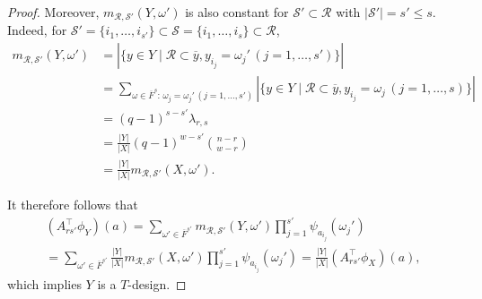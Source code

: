 \documentclass[10pt,a4paper]{amsart}
\begin{document}
\begin{proof}
Moreover, $m_{\mathcal{R},\mathcal{S}'}(Y,\omega')$ is also constant for $\mathcal{S}'\subset \mathcal{R}$ with $|\mathcal{S}'|=s'\leq s$. 
Indeed, for $\mathcal{S}'=\{i_1,\ldots,i_{s'}\} \subset \mathcal{S}=\{i_1,\ldots, i_s\} \subset \mathcal{R}$, 
\begin{align}
m_{\mathcal{R},\mathcal{S'}}(Y,\omega')&=|\{y \in Y \mid \mathcal{R} \subset \overline{y},y_{i_j}=\omega_{j}'\, (j=1,\ldots,s')\}|\nonumber\\
&=\sum_{\omega \in \overline{F}^s\colon\,  \omega_{j}=\omega_{j}'\, (j=1,\ldots,s')} 
|\{y \in Y \mid \mathcal{R} \subset \overline{y},y_{i_j}=\omega_{j}\, (j=1,\ldots,s)\}|\nonumber\\
&=(q-1)^{s-s'} \lambda_{r,s} \label{eq:(q-1)ss'lambda}\\
&=\frac{|Y|}{|X|} (q-1)^{w-s'}\binom{n-r}{w-r}\nonumber\\
&=\frac{|Y|}{|X|} m_{\mathcal{R},\mathcal{S'}}(X,\omega').\nonumber 
\end{align}

It therefore follows that 
\begin{multline*}
(A_{rs'}^\top \phi_Y)(a)=\sum_{\omega' \in \overline{F}^{s'}} 
   m_{\mathcal{R},\mathcal{S'}}(Y,\omega') 
   \prod_{j=1}^{s'} \psi_{a_{i_j}}(\omega_j')\\
   =\sum_{\omega' \in \overline{F}^{s'}} 
   \frac{|Y|}{|X|}m_{\mathcal{R},\mathcal{S}'}(X,\omega') 
   \prod_{j=1}^{s'} \psi_{a_{i_j}}(\omega_j')=\frac{|Y|}{|X|}(A_{rs'}^\top \phi_X)(a),
    \end{multline*}
    which implies $Y$ is a $T$-design. 
\end{proof}
\end{document}
